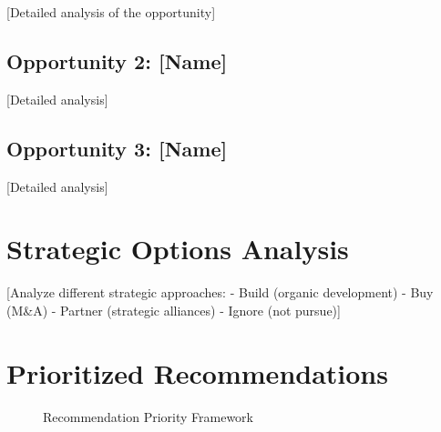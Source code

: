 \documentclass[11pt,letterpaper]{report}
\begin{document}
[Detailed analysis of the opportunity]

\subsection{Opportunity 2: [Name]}
[Detailed analysis]

\subsection{Opportunity 3: [Name]}
[Detailed analysis]

\section{Strategic Options Analysis}

[Analyze different strategic approaches:
- Build (organic development)
- Buy (M\&A)
- Partner (strategic alliances)
- Ignore (not pursue)]

\section{Prioritized Recommendations}


\begin{figure}[htbp]
\centering
\caption{Recommendation Priority Framework}
\label{fig:recommendations}
\end{figure}
\end{document}
